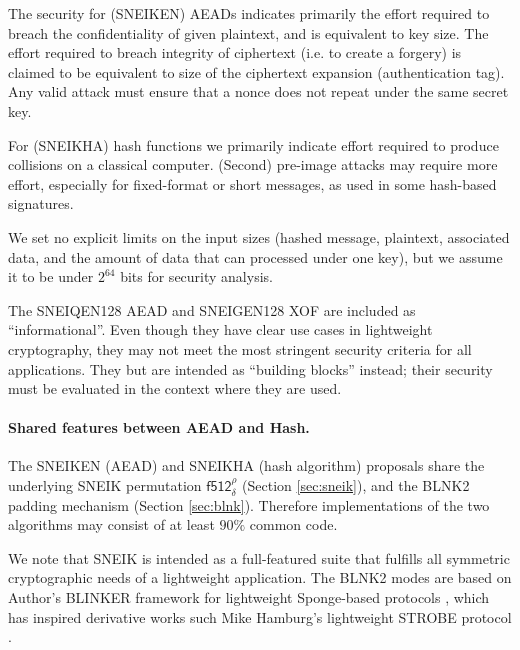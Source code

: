 \documentclass{iacrtrans}
\newcommand{\msf}[1]{\mathsf{#1}}
\begin{document}
	The security for (SNEIKEN) AEADs indicates primarily the effort 
	required to breach the confidentiality of given plaintext, and
	is equivalent to key size. 
	The effort required to breach integrity of ciphertext (i.e. to
	create a forgery) is claimed to be equivalent to size of the 
	ciphertext expansion (authentication tag). Any valid attack must 
	ensure that a nonce does not repeat under the same secret key. 

	For (SNEIKHA) hash functions we primarily indicate effort required to 
	produce collisions on a classical computer. (Second) pre-image attacks
	may require more effort, especially for fixed-format or short messages,
	as used in some hash-based signatures.

	We set no explicit limits on the input sizes (hashed message,
	plaintext, associated data, and the amount of data that can processed 
	under one key), but we assume it to be under $2^{64}$ bits for 
	security analysis.

	The SNEIQEN128 AEAD and SNEIGEN128 XOF are included as ``informational''.
	Even though they have clear use cases in lightweight cryptography, they 
	may not meet the most stringent security criteria for all applications. 
	They but are intended as ``building blocks'' instead; their security must 
	be evaluated in the context where they are used. 

	\paragraph{Shared features between AEAD and Hash.} The SNEIKEN (AEAD) and
	SNEIKHA (hash algorithm) proposals share the underlying SNEIK permutation
	$\msf{f512}^\rho_\delta$ (Section \ref{sec:sneik}), and the BLNK2 padding
	mechanism (Section \ref{sec:blnk}). Therefore implementations of the 
	two algorithms may consist of at least $90\%$ common code.
	
	We note that SNEIK is intended as a full-featured suite that fulfills
	all symmetric cryptographic needs of a lightweight application.
	The BLNK2 modes are based on Author's BLINKER framework for 
	lightweight Sponge-based protocols \cite{DBLP:conf/ctrsa/Saarinen14a}, 
	which has inspired derivative works such Mike Hamburg's lightweight STROBE 
	protocol \cite{DBLP:journals/iacr/Hamburg17}.
\end{document}
